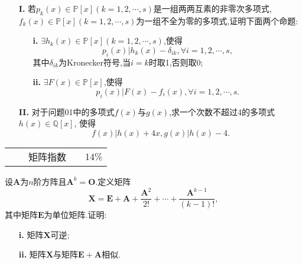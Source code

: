 \documentclass[a4paper]{article}
\newcommand\bsy{\boldsymbol}
\newcommand\CCC{\mathbb{C}}
\newcommand\sqm{n \times n}
\begin{document}
\begin{spacing}{1.5}
\begin{enumerate}
\item[\textbf{I.}] 若$p_k(x)\in \mathbb{P} [x](k=1,2,\cdots,s)$是一组两两互素的非零次多项式,~$f_k(x)\in \mathbb{P} [x](k=1,2,\cdots,s)$为一组不全为零的多项式,证明下面两个命题:
    \begin{enumerate}
        \item[\textbf{i.}] $\exists h_k(x)\in \mathbb{P} [x](k=1,2,\cdots,s)$,使得$$ p_i(x)|h_k(x)-\delta_{ik} ,\forall i=1,2,\cdots,s,$$
其中$\delta_{ik}$为Kronecker符号,当$i=k$时取1,否则取0;

        \item[\textbf{ii.}]$\exists F(x)\in\mathbb{P}[x]$,使得$$p_i(x)|F(x)-f_i(x),\forall i = 1,2,\cdots,s.$$
    \end{enumerate}
\item[\textbf{II.}] 对于问题\textsf{01}中的多项式$f(x)$与$g(x)$,求一个次数不超过4的多项式$h(x)\in\mathbb{Q}[x]$,  使得
$$f(x)|h(x)+4x,g(x)|h(x)-4.$$
\end{enumerate}
\vspace{5mm}












\begin{table}[!ht]
	\renewcommand\arraystretch{2}
	\begin{tabular}{m{1cm}<{\centering}m{12cm}m{2cm}m{1.5cm}<{\centering}}
 \Large\cellcolor{black} \textcolor{white}{\textsf{06}}  & \large \cellcolor{lightgray}\textsf{矩阵指数} & &\cellcolor{lightgray} \large{14\%} \\
\end{tabular}
\end{table}

设$\bsy{A}$为$n$阶方阵且$\bsy{A}^k=\bsy{O}$.定义矩阵$$\bsy{X}=\bsy{E}+\bsy{A}+\frac{\bsy{A}^2}{2!}+\cdots+\frac{\bsy{A}^{k-1}}{(k-1)!},$$其中矩阵$\bsy{E}$为单位矩阵.证明:

\begin{enumerate}
    \item[\textbf{i.}] 矩阵$\bsy{X}$可逆;
    
    \item[\textbf{ii.}] 矩阵$\bsy{X}$与矩阵$\bsy{E+A}$相似.
\end{enumerate}






\end{spacing}
\end{document}
